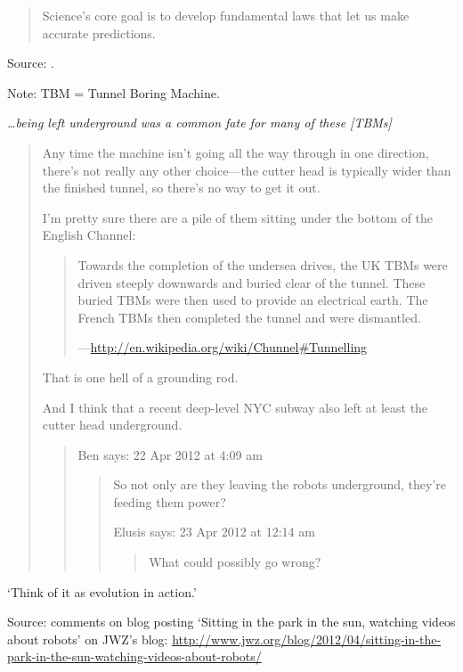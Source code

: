 \documentclass[a4paper]{article}
\begin{document}
\begin{quote}
	Science's core goal is to develop fundamental laws that let us make accurate predictions.
\end{quote}
Source: \cite[p.~16]{Evans2011}.
\medskip

Note: TBM = Tunnel Boring Machine.

{\it \ldots being left underground was a common fate for many of these [TBMs]}

\begin{quotation}
	Any time the machine isn't going all the way through in one direction, there's not really any
	other choice---the cutter head is typically wider than the finished tunnel, so there's no way
	to get it out.

	I'm pretty sure there are a pile of them sitting under the bottom of the English Channel:

	\begin{quotation}
		Towards the completion of the undersea drives, the UK TBMs were driven steeply downwards
		and buried clear of the tunnel. These buried TBMs were then used to provide an electrical
		earth. The French TBMs then completed the tunnel and were dismantled.

		---\url{http://en.wikipedia.org/wiki/Chunnel#Tunnelling}
	\end{quotation}

	That is one hell of a grounding rod.

	And I think that a recent deep-level NYC subway also left at least the cutter head underground.

	\begin{quote}
		Ben says: 22 Apr 2012 at 4:09 am
		\begin{quote}
			So not only are they leaving the robots underground, they're feeding them power?

			Elusis says: 23 Apr 2012 at 12:14 am

			\begin{quote}
				What could possibly go wrong?
			\end{quote}
		\end{quote}
	\end{quote}
\end{quotation}

`Think of it as evolution in action.'

Source: comments on blog posting `Sitting in the park in the sun, watching videos about robots' on
JWZ's blog: 
\url{http://www.jwz.org/blog/2012/04/sitting-in-the-park-in-the-sun-watching-videos-about-robots/}
\medskip
\end{document}
